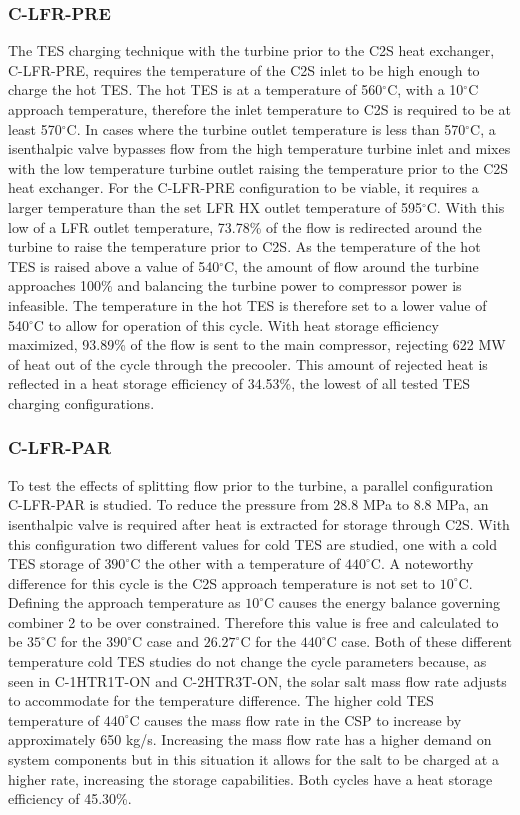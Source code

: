 \begin{paracol}{2}
\subsubsection{C-LFR-PRE}
The TES charging technique with the turbine prior to the C2S heat exchanger, C-LFR-PRE, requires the temperature of the C2S inlet to be high enough to charge the hot TES. The hot TES is at a temperature of 560$^{\circ}$C, with a 10$^{\circ}$C approach temperature, therefore the inlet temperature to C2S is required to be at least 570$^{\circ}$C. In cases where the turbine outlet temperature is less than 570$^{\circ}$C, a isenthalpic valve bypasses flow from the high temperature turbine inlet and mixes with the low temperature turbine outlet raising the temperature prior to the C2S heat exchanger. For the C-LFR-PRE configuration to be viable, it requires a larger temperature than the set LFR HX outlet temperature of 595$^{\circ}$C. With this low of a LFR outlet temperature, 73.78\% of the flow is redirected around the turbine to raise the temperature prior to C2S. As the temperature of the hot TES is raised above a value of 540$^{\circ}$C, the amount of flow around the turbine approaches 100\% and balancing the turbine power to compressor power is infeasible. The temperature in the hot TES is therefore set to a lower value of 540$^{\circ}$C to allow for operation of this cycle. With heat storage efficiency maximized, 93.89\% of the flow is sent to the main compressor, rejecting 622 MW of heat out of the cycle through the precooler. This amount of rejected heat is reflected in a heat storage efficiency of 34.53\%, the lowest of all tested TES charging configurations.

\subsubsection{C-LFR-PAR}

To test the effects of splitting flow prior to the turbine, a parallel configuration C-LFR-PAR is studied. To reduce the pressure from 28.8 MPa to 8.8 MPa, an isenthalpic valve is required after heat is extracted for storage through C2S. With this configuration two different values for cold TES are studied, one with a cold TES storage of $390^{\circ}$C the other with a temperature of $440^{\circ}$C. A noteworthy difference for this cycle is the C2S approach temperature is not set to $10^{\circ}$C. Defining the approach temperature as $10^{\circ}$C causes the energy balance governing combiner 2 to be over constrained. Therefore this value is free and calculated to be $35^{\circ}$C for the $390^{\circ}$C case and $26.27^{\circ}$C for the $440^{\circ}$C case. Both of these different temperature cold TES studies do not change the cycle parameters because, as seen in C-1HTR1T-ON and C-2HTR3T-ON, the solar salt mass flow rate adjusts to accommodate for the temperature difference. The higher cold TES temperature of $440^{\circ}$C causes the mass flow rate in the CSP to increase by approximately 650 kg/s. Increasing the mass flow rate has a higher demand on system components but in this situation it allows for the salt to be charged at a higher rate, increasing the storage capabilities. Both cycles have a heat storage efficiency of 45.30\%.


\end{paracol}
